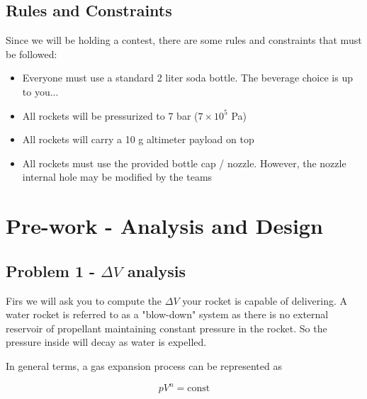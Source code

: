 \documentclass[]{memoir} %
\begin{document}
\subsection{Rules and Constraints}

Since we will be holding a contest, there are some rules and constraints that must be followed:

\begin{itemize}
    \item Everyone must use a standard 2 liter soda bottle.  The beverage choice is up to you...
    \item All rockets will be pressurized to 7 bar ($7\times10^5$ Pa)
    \item All rockets will carry a 10 g altimeter payload on top
    \item All rockets must use the provided bottle cap / nozzle.  However, the nozzle internal
        hole may be modified by the teams
\end{itemize}

\section{Pre-work - Analysis and Design}

\subsection{Problem 1 - $\Delta V$ analysis}
Firs we will ask you to compute the $\Delta V$ your rocket is capable of delivering.  A water 
rocket is referred to as a "blow-down" system as there is no external reservoir of propellant
maintaining constant pressure in the rocket.  So the pressure inside will decay as water is
expelled. 

In general terms, a gas expansion process can be represented as

\begin{equation}
    pV^n = \text{const}
\end{equation}
\end{document}

